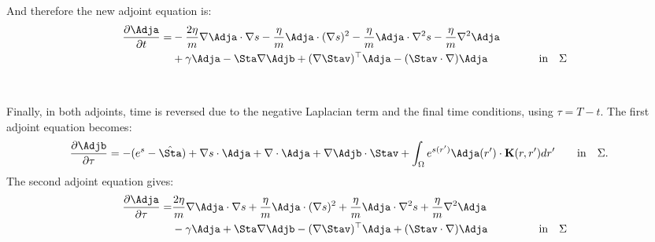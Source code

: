 And therefore the new adjoint equation is:
\begin{align*}
\frac{\partial \Adja}{\partial t} =& - \frac{2\eta}{m} \nabla \Adja \cdot \nabla s - \frac{\eta}{m} \Adja \cdot (\nabla s)^2 - \frac{\eta}{m}\Adja \cdot \nabla^2 s - \frac{\eta}{m} \nabla^2 \Adja \\
&+\gamma \Adja-\Sta\nabla \Adjb + (\nabla \Stav)^\top\Adja -  (\Stav \cdot \nabla)\Adja   \ \qquad\qquad \  \text{in} \quad \Sigma
\end{align*}
\\
\\
Finally, in both adjoints, time is reversed due to the negative Laplacian term and the final time conditions, using $\tau = T-t$. 
The first adjoint equation becomes:
\begin{align*}
& \frac{\partial \Adjb}{\partial \tau} = - (e^s - \hat \Sta) + \nabla s \cdot \Adja +\nabla\cdot \Adja  +  \nabla \Adjb \cdot \Stav  + \int_\Omega  e^{s(r')}\Adja(r') \cdot\mathbf{K}(r,r')   dr' \qquad \text{in} \quad \Sigma. 
\end{align*}
The second adjoint equation gives:
\begin{align*}
\frac{\partial \Adja}{\partial \tau} =& \frac{2\eta}{m} \nabla \Adja \cdot \nabla s + \frac{\eta}{m} \Adja \cdot (\nabla s)^2 + \frac{\eta}{m}\Adja \cdot \nabla^2 s + \frac{\eta}{m} \nabla^2 \Adja \\
&-\gamma \Adja+\Sta\nabla \Adjb - (\nabla \Stav)^\top\Adja+  (\Stav \cdot \nabla)\Adja   \ \qquad\qquad \  \text{in} \quad \Sigma
\end{align*}
